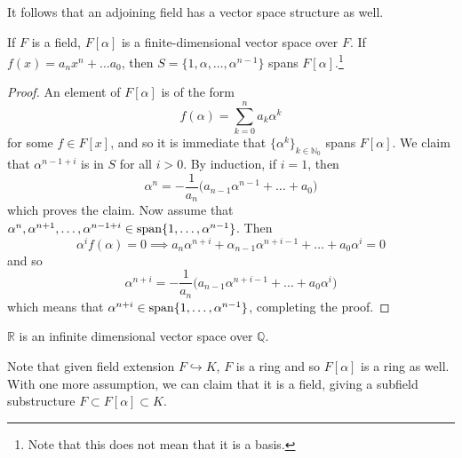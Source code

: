   It follows that an adjoining field has a vector space structure as well. 

  \begin{lemma}
    If $F$ is a field, $F[\alpha]$ is a finite-dimensional vector space over $F$. If $f(x) = a_n x^n + \ldots a_0$, then $S = \{1, \alpha, \ldots, \alpha^{n-1}\}$ spans $F[\alpha]$.\footnote{Note that this does not mean that it is a basis.} 
  \end{lemma}
  \begin{proof}
    An element of $F[\alpha]$ is of the form 
    \begin{equation}
      f(\alpha) = \sum_{k=0}^n a_k \alpha^k
    \end{equation} 
    for some $f \in F[x]$, and so it is immediate that $\{\alpha^k\}_{k \in \mathbb{N}_0}$ spans $F[\alpha]$. We claim that $\alpha^{n-1+i}$ is in $S$ for all $i > 0$. By induction, if $i = 1$, then 
    \begin{equation}
      \alpha^n = -\frac{1}{a_n} \big( a_{n-1} \alpha^{n-1} + \ldots + a_0 \big)
    \end{equation}
    which proves the claim. Now assume that $\alpha^n, \alpha^{n+1}, \ldots, \alpha^{n-1+i} \in \operatorname{span}\{1, \ldots, \alpha^{n-1}\}$. Then 
    \begin{equation}
      \alpha^i f(\alpha) = 0 \implies a_n \alpha^{n+i} + \alpha_{n-1} \alpha^{n+i-1} + \ldots + a_0 \alpha^i = 0 
    \end{equation}
    and so 
    \begin{equation}
      \alpha^{n+i} = -\frac{1}{a_n} \big(a_{n-1} \alpha^{n+i-1} + \ldots + a_0 \alpha^i)
    \end{equation}
    which means that $\alpha^{n+i} \in \operatorname{span}\{1, \ldots, \alpha^{n-1}\}$, completing the proof. 
  \end{proof} 

  \begin{theorem} 
    $\mathbb{R}$ is an infinite dimensional vector space over $\mathbb{Q}$. 
  \end{theorem}

  Note that given field extension $F \hookrightarrow K$, $F$ is a ring and so $F[\alpha]$ is a ring as well. With one more assumption, we can claim that it is a field, giving a subfield substructure $F \subset F[\alpha] \subset K$. 

